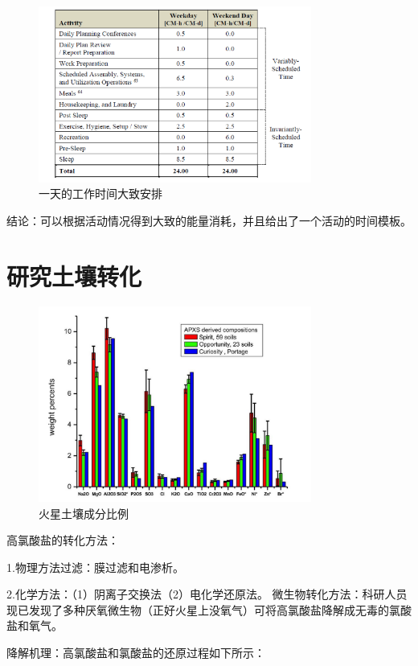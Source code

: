 \begin{figure}[H]
  \centering
  \includegraphics[width=0.8\textwidth]{figure/day-plan.png}
  \caption{一天的工作时间大致安排}
\end{figure}

结论：可以根据活动情况得到大致的能量消耗，并且给出了一个活动的时间模板。

\section{研究土壤转化}

\begin{figure}[H]
  \centering
  \includegraphics[width=0.8\textwidth]{figure/soil-composition.png}
  \caption{火星土壤成分比例}
\end{figure}
高氯酸盐的转化方法：

1.物理方法过滤：膜过滤和电渗析。

2.化学方法：（1）阴离子交换法（2）电化学还原法。
微生物转化方法：科研人员现已发现了多种厌氧微生物（正好火星上没氧气）可将高氯酸盐降解成无毒的氯酸盐和氧气。

降解机理：高氯酸盐和氯酸盐的还原过程如下所示：

